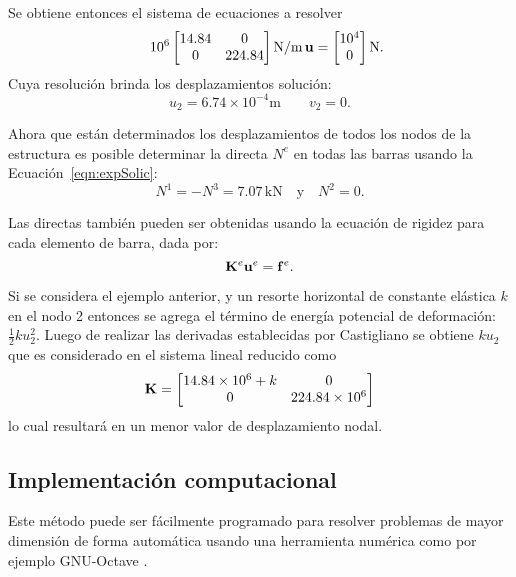 Se obtiene entonces el sistema de ecuaciones a resolver
\begin{equation}
\quad 10^6
\left[
\begin{matrix}
14.84 & 0 \\
0 & 224.84 
\end{matrix}
\right]
\text{N/m}
\,
{\bf u} = 
\left[
\begin{matrix}
10^4 \\
0 
\end{matrix}
\right] \text{N}.
\end{equation}
%
Cuya resolución brinda los desplazamientos solución:
%
\begin{equation}
\boxed{
u_{2} = 6.74 \times 10^{-4} \text{m}  \qquad v_{2} = 0.
}\end{equation}

Ahora que están determinados los desplazamientos de todos los nodos de la estructura es posible determinar la directa $N^e$ en todas las barras usando la Ecuación~\eqref{eqn:expSolic}:
%
\begin{equation}
N^1 = - N^3 =7.07 \, \text{kN} \quad \text{y} \quad N^2 = 0.
\end{equation}


Las directas también pueden ser obtenidas usando la ecuación de rigidez para cada elemento de barra, dada por:
%
$$
{\bf K}^e {\bf u}^e = {\bf f}^e.
$$






Si se considera el ejemplo anterior, y un resorte horizontal de constante elástica $k$ en el nodo 2 entonces se agrega el término de energía potencial de deformación: $\frac{1}{2} k u_2^2$. %
Luego de realizar las derivadas establecidas por Castigliano se obtiene $k u_2$ que es considerado en el sistema lineal reducido como
%
\begin{equation}
{\bf K} =
\left[
\begin{matrix}
14.84 \times10^6 +k & 0 \\
0 & 224.84 \times10^6 
\end{matrix}
\right]
\end{equation}
%
lo cual resultará en un menor valor de desplazamiento nodal.

\subsection{Implementación computacional}

Este método puede ser fácilmente programado para resolver problemas de mayor dimensión de forma automática usando una herramienta numérica como por ejemplo GNU-Octave \citep{Eaton2015}.  %

